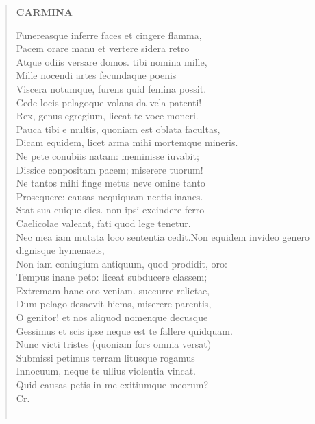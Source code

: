 \documentclass[11pt, a4paper]{report}
\begin{document}
\begin{verse}
     \marginpar{[64]} \begin{center} \textbf{CARMINA} \end{center}Funereasque inferre faces et cingere flamma, \\ Pacem orare manu et vertere sidera retro \\ Atque odiis versare domos. tibi nomina mille, \\ Mille nocendi artes  \rbrack  fecundaque poenis \\ Viscera  \rbrack  \rbrack  notumque, furens quid femina possit. \\ Cede locis pelagoque volans da vela patenti! \\ Rex, genus egregium, liceat te voce moneri. \\ Pauca tibi e multis, quoniam est oblata facultas, \\ Dicam equidem, licet arma mihi mortemque mineris. \\ Ne pete conubiis natam: meminisse iuvabit; \\ Dissice conpositam pacem; miserere tuorum! \\ Ne tantos mihi finge metus neve omine tanto \\ Prosequere: causas nequiquam nectis inanes. \\ Stat sua cuique dies. non ipsi excindere ferro \\ Caelicolae valeant, fati quod lege tenetur. \\ Nec mea iam mutata loco sententia cedit.Non equidem invideo genero dignisque hymenaeis, \\ Non iam coniugium antiquum, quod prodidit, oro: \\ Tempus inane peto: liceat subducere classem; \\ Extremam hanc oro veniam. succurre relictae, \\ Dum pclago desaevit hiems, miserere parentis, \\ O genitor! et nos aliquod nomenque decusque \\ Gessimus \lbrack et \rbrack  scis ipse neque est te fallere quidquam. \\ Nunc victi tristes (quoniam fors omnia versat) \rbrack  \\ Submissi petimus terram litusque rogamus \\ Innocuum, neque te ullius violentia vincat. \\ Quid causas petis  \rbrack  in me exitiumque meorum? \\ Cr. \\ 
        ﻿\pagebreak 

\end{verse}
\end{document}
